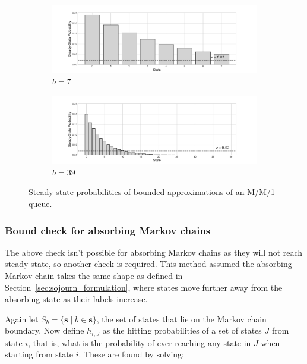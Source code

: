 \documentclass{article}
\begin{document}
\begin{figure}[!htbp]
  \begin{center}
  \begin{subfigure}[b]{0.65\textwidth}
    \includegraphics[width=\textwidth]{img/example_mc_8states.pdf}
    \caption{$b=7$}
    \label{fig:ergodic_b7}
  \end{subfigure}
  \begin{subfigure}[b]{0.65\textwidth}
    \includegraphics[width=\textwidth]{img/example_mc_40states.pdf}
    \caption{$b=39$}
    \label{fig:ergodic_b39}
  \end{subfigure}
  \end{center}
  \caption{Steady-state probabilities of bounded approximations of an M/M/1 queue.}
  \label{fig:ergodic_check}
\end{figure}


\subsubsection{Bound check for absorbing Markov chains}\label{sec:absorbing_check}
The above check isn't possible for absorbing Markov chains as they will not
reach steady state, so another check is required. This method assumed the
absorbing Markov chain takes the same shape as defined in
Section~\ref{sec:sojourn_formulation}, where states move further away from the
absorbing state as their labels increase.

Again let $S_b = \{\underline{\mathbf{s}} \;|\; b \in \underline{\mathbf{s}}\}$,
the set of states that lie on the Markov chain boundary. Now define $h_{i,J}$ as
the hitting probabilities of a set of states $J$ from state $i$, that is, what
is the probability of ever reaching any state in $J$ when starting from state
$i$. These are found by solving:
\end{document}
